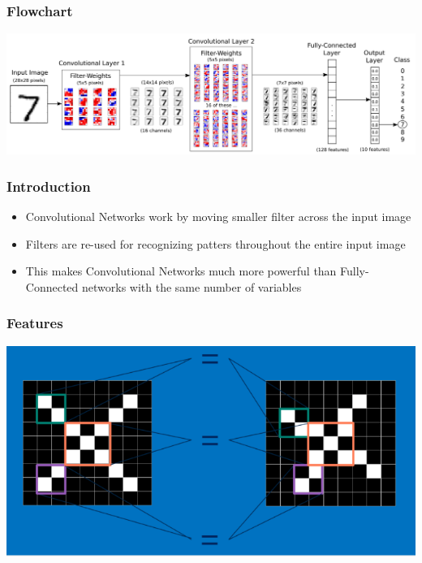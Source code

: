 \documentclass[11pt]{article}
\begin{document}
\subsubsection*{Flowchart}
\label{sec:orgefb7b41}
\begin{center}
\begin{center}
\includegraphics[width=.9\linewidth]{images/cnn_network_flowchart.png}
\end{center}
\end{center}
\subsubsection*{Introduction}
\label{sec:orge47eded}
\begin{itemize}
\item Convolutional Networks work by moving smaller filter across the input image
\item Filters are re-used for recognizing patters throughout the entire input image
\item This makes Convolutional Networks much more powerful than Fully-Connected
networks with the same number of variables
\end{itemize}
\subsubsection*{Features}
\label{sec:org1e45cce}
\begin{center}
\begin{center}
\includegraphics[width=.9\linewidth]{images/features.png}
\end{center}
\end{center}
\end{document}
